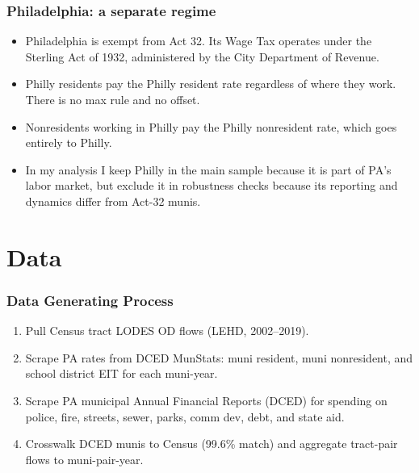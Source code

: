 \documentclass[xcolor = x11names, compress, aspectratio = 169]{beamer}
\renewcommand{\(}{\begin{columns}}
\renewcommand{\)}{\end{columns}}
\newcommand{\<}[1]{\begin{column}{#1}}
\renewcommand{\>}{\end{column}}
\begin{document}
\begin{frame}
\frametitle{Philadelphia: a separate regime}
    \small
    \begin{itemize}\setlength{\itemsep}{0.15cm}
        \item Philadelphia is exempt from Act 32. Its Wage Tax operates
        under the Sterling Act of 1932, administered by the City
        Department of Revenue.
        \item Philly residents pay the Philly resident rate regardless
        of where they work. There is no max rule and no offset.
        \item Nonresidents working in Philly pay the Philly nonresident
        rate, which goes entirely to Philly.
        \item In my analysis I keep Philly in the main sample because
        it is part of PA's labor market, but exclude it in robustness
        checks because its reporting and dynamics differ from Act-32 munis.
    \end{itemize}
\end{frame}


\section{Data}

\begin{frame}
\frametitle{Data Generating Process}
    \begin{enumerate}\setlength{\itemsep}{0.2cm}
        \item Pull Census tract LODES OD flows (LEHD, 2002--2019).
        \item Scrape PA rates from DCED MunStats: muni resident,
        muni nonresident, and school district EIT for each muni-year.
        \item Scrape PA municipal Annual Financial Reports (DCED) for
        spending on police, fire, streets, sewer, parks, comm dev,
        debt, and state aid.
        \item Crosswalk DCED munis to Census (99.6\% match)
        and aggregate tract-pair flows to muni-pair-year.
    \end{enumerate}
\end{frame}
\end{document}
